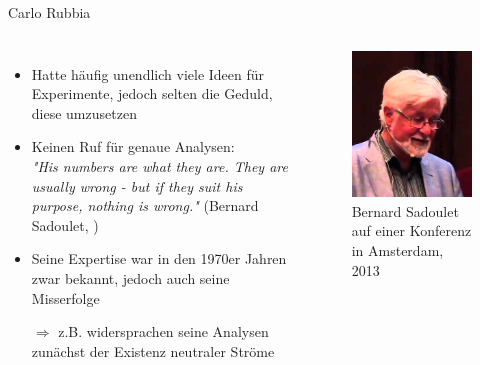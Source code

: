 \documentclass[aspectratio=1610, professionalfonts, 10pt]{beamer}
\begin{document}
\begin{frame}{Carlo Rubbia}
	\begin{columns}
				\begin{itemize}
					\setlength\itemsep{0.5em}
					\item Hatte häufig unendlich viele Ideen für Experimente, jedoch selten die Geduld, diese umzusetzen
					\item Keinen Ruf für genaue Analysen:\\
					\emph{"His numbers are what they are. They are usually wrong - but if they suit his purpose, nothing is wrong."} (Bernard Sadoulet, \cite{1556151128})
					\item Seine Expertise war in den 1970er Jahren zwar bekannt, jedoch auch seine Misserfolge
					\item[$\Rightarrow$] z.B. widersprachen seine Analysen zunächst der Existenz neutraler Ströme
				\end{itemize}

			\begin{figure}
	  			\centering
				\includegraphics[width=0.8\linewidth]{Images/sadoulet.png}
	  			\caption{Bernard Sadoulet auf einer Konferenz in Amsterdam, 2013 \cite{Sadoulet}}
	  			\label{fig:sad}
			\end{figure}
	\end{columns}
\end{frame}
\end{document}
